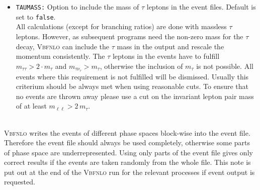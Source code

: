 \documentclass[english,12pt]{article}
\begin{document}
\begin{itemize}
  {\tt PARTIAL\_UNWEIGHTING = true} will give the desired number of events with weight 1
  and additionally a few events with weight > 1 which occured during the event generation.\\
  Default is {\tt PARTIAL\_UNWEIGHTING = false}.
\item {\tt TAUMASS:} Option to include the mass of $\tau$ leptons in the event files. 
Default is set to {\tt false}.\\
All calculations (except for branching ratios) are done with massless $\tau$ leptons.
However, as subsequent programs need the non-zero mass for the $\tau$ decay, \textsc{Vbfnlo}
can include the $\tau$ mass in the output and rescale the momentum consistently.
The $\tau$ leptons in the events have to fulfill $m_{\tau\tau} > 2 \cdot m_\tau$ and 
$m_{\tau\nu_\tau} > m_\tau$, otherwise the inclusion of $m_\tau$ is not possible. 
All events where this requirement is not fulfilled will be dismissed. 
Usually this criterium should be always met when using reasonable cuts.
To ensure that no events are thrown away please use a cut on the invariant lepton pair mass
of at least $m_{\ell\ell} > 2 \, m_\tau$.
\end{itemize}

 \nopagebreak \\
\textsc{Vbfnlo} writes the events of different phase spaces block-wise into the event file.
Therefore the event file should always be used completely, otherwise some parts of phase
space are underrepresented. Using only parts of the event file gives only correct results
if the events are taken randomly from the whole file.
This note is put out at the end of the \textsc{Vbfnlo} run for the relevant processes
if event output is requested.

\end{document}
